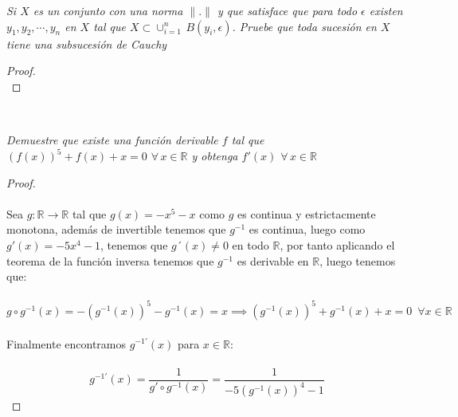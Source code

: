 \documentclass[11pt,letterpaper]{article}
\newcommand{\R}{\mathbb{R}}
\begin{document}
\begin{tcolorbox}[
	title = \textcolor{black}{\textcolor{white}{Problema 3}},]
\textit{Si $X$ es un conjunto con una norma $\|.\|$ y que satisface que para todo $\epsilon$ existen $y_1,y_2,\cdots, y_n$
en $X$ tal que $X\subset \cup_{i=1}^{n}\,B(y_i,\epsilon)$. Pruebe que toda sucesi\'on en $X$ tiene una subsucesi\'on de Cauchy}
\end{tcolorbox}
\begin{proof}\,\\
    
\end{proof}\,\\
\begin{tcolorbox}[
	title = \textcolor{black}{\textcolor{white}{Problema 5}},]
\textit{Demuestre que existe una funci\'on derivable $f$ tal que $(f(x))^5+f(x)+x=0$ $\forall\,x\in \R$ y obtenga
$f'(x)$ $\forall\,x\in \R$
}
\end{tcolorbox}
\begin{proof}\,\\
    \,\\
    Sea $g:\R\rightarrow \R$ tal que $g(x)=-x^5-x$ como $g$ es continua y
    estrictacmente monotona, adem\'as de invertible tenemos que $g^{-1}$ es continua, luego como $g'(x)=-5x^4-1$, tenemos que $g´(x)\neq 0$ en todo $\R$,
    por tanto aplicando el teorema de la funci\'on inversa tenemos que $g^{-1}$ es derivable en $\R$, luego tenemos que:\,\\
    \,\\
    \begin{equation*}
        g\circ g^{-1}(x)=-(g^{-1}(x))^5-g^{-1}(x)=x\implies (g^{-1}(x))^5+g^{-1}(x)+x=0\,\,\,\forall x\in \R
    \end{equation*}\,\\
    Finalmente encontramos $g^{-1'}(x)$ para $x\in \R$:\,\\
    \,\\
    \begin{equation*}
        g^{-1'}(x)=\frac{1}{g'\circ g^{-1}(x)}=\frac{1}{-5(g^{-1}(x))^4-1}
    \end{equation*}
\end{proof}
\end{document}

